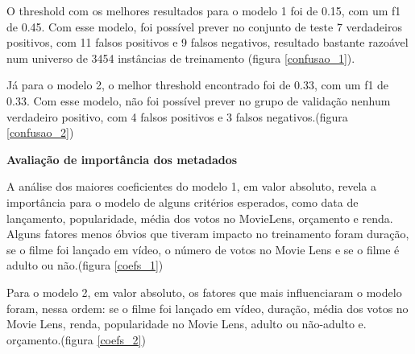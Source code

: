         O threshold com os melhores resultados para o modelo 1 foi de 0.15, com um f1 de 0.45. Com esse modelo, foi possível prever no conjunto de teste 7 verdadeiros positivos, com 11 falsos positivos e 9 falsos negativos, resultado bastante razoável num universo de 3454 instâncias de treinamento (figura \ref{confusao_1}).
        
        Já para o modelo 2, o melhor threshold encontrado foi de 0.33, com um f1 de 0.33. Com esse modelo, não foi possível prever no grupo de validação nenhum verdadeiro positivo, com 4 falsos positivos e 3 falsos negativos.(figura \ref{confusao_2})

        \textbf{Avaliação de importância dos metadados}\par
        A análise dos maiores coeficientes do modelo 1, em valor absoluto, revela a importância para o modelo de alguns critérios esperados, como data de lançamento, popularidade, média dos votos no MovieLens, orçamento e renda. Alguns fatores menos óbvios que tiveram impacto no treinamento foram duração, se o filme foi lançado em vídeo, o número de votos no Movie Lens e se o filme é adulto ou não.(figura \ref{coefs_1})\par
        
        Para o modelo 2, em valor absoluto, os fatores que mais influenciaram o modelo foram, nessa ordem: se o filme foi lançado em vídeo, duração, média dos votos no Movie Lens, renda, popularidade no Movie Lens, adulto ou não-adulto e. orçamento.(figura \ref{coefs_2})\par